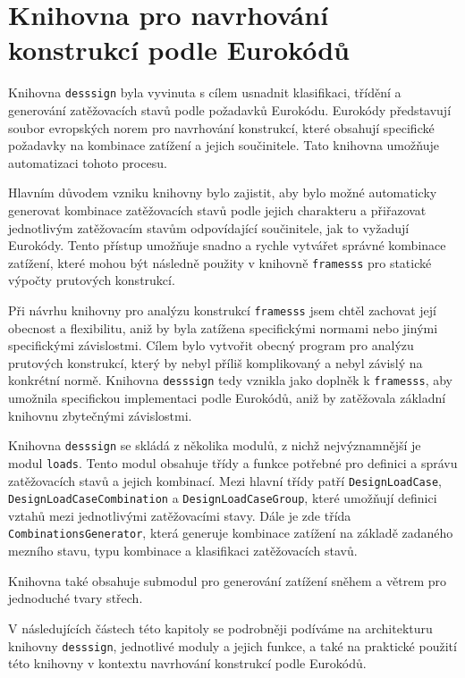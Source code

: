 \chapter{Knihovna pro navrhování konstrukcí podle Eurokódů}

Knihovna \texttt{desssign} byla vyvinuta s cílem usnadnit klasifikaci, třídění a generování zatěžovacích stavů podle požadavků Eurokódu. Eurokódy představují soubor evropských norem pro navrhování konstrukcí, které obsahují specifické požadavky na kombinace zatížení a jejich součinitele. Tato knihovna umožňuje automatizaci tohoto procesu.

Hlavním důvodem vzniku knihovny bylo zajistit, aby bylo možné automaticky generovat kombinace zatěžovacích stavů podle jejich charakteru a přiřazovat jednotlivým zatěžovacím stavům odpovídající součinitele, jak to vyžadují Eurokódy. Tento přístup umožňuje snadno a rychle vytvářet správné kombinace zatížení, které mohou být následně použity v knihovně \texttt{framesss} pro statické výpočty prutových konstrukcí.

Při návrhu knihovny pro analýzu konstrukcí \texttt{framesss} jsem chtěl zachovat její obecnost a flexibilitu, aniž by byla zatížena specifickými normami nebo jinými specifickými závislostmi. Cílem bylo vytvořit obecný program pro analýzu prutových konstrukcí, který by nebyl příliš komplikovaný a nebyl závislý na konkrétní normě. Knihovna \texttt{desssign} tedy vznikla jako doplněk k \texttt{framesss}, aby umožnila specifickou implementaci podle Eurokódů, aniž by zatěžovala základní knihovnu zbytečnými závislostmi.

Knihovna \texttt{desssign} se skládá z několika modulů, z nichž nejvýznamnější je modul \texttt{loads}. Tento modul obsahuje třídy a funkce potřebné pro definici a správu zatěžovacích stavů a jejich kombinací. Mezi hlavní třídy patří \texttt{DesignLoadCase}, \texttt{DesignLoadCaseCombination} a \texttt{DesignLoadCaseGroup}, které umožňují definici vztahů mezi jednotlivými zatěžovacími stavy. Dále je zde třída \texttt{CombinationsGenerator}, která generuje kombinace zatížení na základě zadaného mezního stavu, typu kombinace a klasifikaci zatěžovacích stavů.

Knihovna také obsahuje submodul pro generování zatížení sněhem a větrem pro jednoduché tvary střech.

V následujících částech této kapitoly se podrobněji podíváme na architekturu knihovny \texttt{desssign}, jednotlivé moduly a jejich funkce, a také na praktické použití této knihovny v kontextu navrhování konstrukcí podle Eurokódů.

